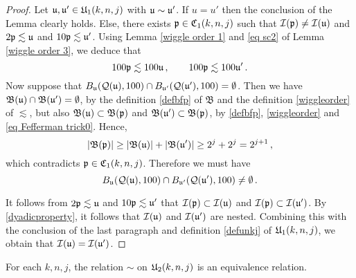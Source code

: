 {\begin{proof}
    Let $\mathfrak u, \mathfrak u' \in \mathfrak U_1(k,n,j)$ with $\mathfrak u \sim \mathfrak u'$. If $u = u'$ then the conclusion of the Lemma clearly holds. Else, there exists $\mathfrak p \in \mathfrak C_1(k,n,j)$ such that $\mathcal{I}(\mathfrak p) \ne \mathcal{I}(\mathfrak u)$ and  $2 \mathfrak p \lesssim \mathfrak u$ and $10 \mathfrak p \lesssim \mathfrak u'$.
    Using Lemma \ref{wiggle order 1} and \eqref{eq sc2} of Lemma \ref{wiggle order 3}, we deduce that
    \begin{equation}
        \label{eq Fefferman trick0}
        100 \mathfrak p\lesssim  100 \mathfrak u\,, \qquad 100 \mathfrak p \lesssim 100\mathfrak u'\,.
    \end{equation}
    Now suppose that $B_{\mathfrak u}(\mathcal{Q}(\mathfrak u), 100) \cap B_{\mathfrak u'}(\mathcal{Q}(\mathfrak u'), 100) = \emptyset$. Then we have $\mathfrak{B}(\mathfrak u) \cap \mathfrak{B}(\mathfrak u') = \emptyset$, by the definition \eqref{defbfp} of $\mathfrak{B}$ and the definition \eqref{wiggleorder} of $\lesssim$, but also $\mathfrak{B}(\mathfrak u) \subset \mathfrak{B}(\mathfrak p)$ and $\mathfrak{B}(\mathfrak u') \subset \mathfrak{B}(\mathfrak p)$, by \eqref{defbfp}, \eqref{wiggleorder} and \eqref{eq Fefferman trick0}.
    Hence,
    $$
        |\mathfrak{B}(\mathfrak p)| \geq |\mathfrak{B}(\mathfrak u)| + |\mathfrak{B}(\mathfrak u')| \geq 2^{j} + 2^j = 2^{j+1}\,,
    $$
    which contradicts $\mathfrak p \in \mathfrak C_1(k,n,j)$. Therefore we must have
    \begin{equation*}
        B_{\mathfrak u}(\mathcal{Q}(\mathfrak u), 100) \cap B_{\mathfrak u'}(\mathcal{Q}(\mathfrak u'), 100) \ne \emptyset\, .
    \end{equation*}

    It follows from $2\mathfrak p \lesssim \mathfrak u$ and $10\mathfrak p \lesssim \mathfrak u'$ that $\mathcal{I}(\mathfrak p) \subset \mathcal{I}(\mathfrak u)$ and $\mathcal{I}(\mathfrak p) \subset \mathcal{I}(\mathfrak u')$. By \eqref{dyadicproperty}, it follows that $\mathcal{I}(\mathfrak u)$ and $\mathcal{I}(\mathfrak u')$ are nested.
    Combining this with the conclusion of the last paragraph and definition \eqref{defunkj} of $\mathfrak U_1(k,n,j)$, we obtain that $\mathcal{I}(\mathfrak u) = \mathcal{I}(\mathfrak u')$.
\end{proof}


\begin{lemma}
\label{equivalence relation}
For each $k,n,j$, the relation $\sim$ on
$\mathfrak U_2(k,n,j)$ is an equivalence relation.
\end{lemma}

}

